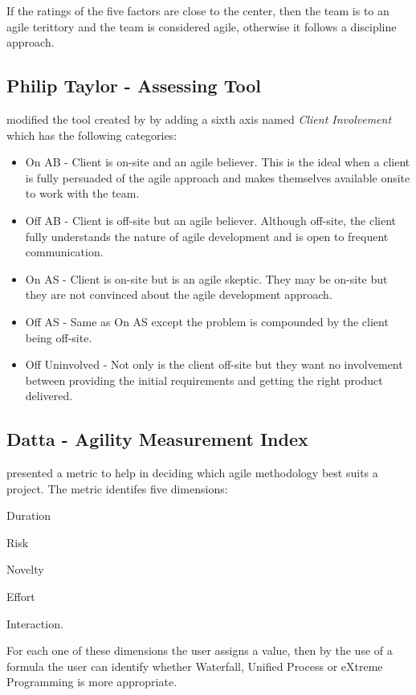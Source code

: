 

If the ratings of the five factors are close to the center, then the team is to an agile terittory and the team  is considered agile, otherwise it follows a discipline approach.

\subsection{Philip Taylor - Assessing Tool} 
\citet{taylor} modified the tool created by \citet{1231450} by adding a sixth axis named  \textit{Client Involvement} which has the following categories:

\begin{itemize}
\item On AB - Client is on-site and an agile believer. This is the ideal when a client is fully persuaded of the agile approach and makes themselves available onsite to work with the team.
\item Off AB - Client is off-site but an agile believer. Although off-site, the client fully understands the nature of agile development and is open to frequent communication.
\item On AS - Client is on-site but is an agile skeptic. They may be on-site but they are not convinced about the agile development approach.
\item Off AS - Same as On AS except the problem is compounded by the client being off-site.
\item Off Uninvolved - Not only is the client off-site but they want no involvement between providing the initial requirements and getting the right product delivered.
\end{itemize}

\subsection{Datta - Agility Measurement Index} %
\citet{datta_dissertation} presented a metric to help in deciding which agile methodology best suits a project. The metric identifes five dimensions: 
\begin{inparaenum} [a\upshape)]
\item Duration
\item Risk
\item Novelty
\item Effort
\item Interaction.
\end{inparaenum}
For each one of these dimensions the user assigns a value, then by the use of a formula the user can identify whether Waterfall, Unified Process or eXtreme Programming is more appropriate.

